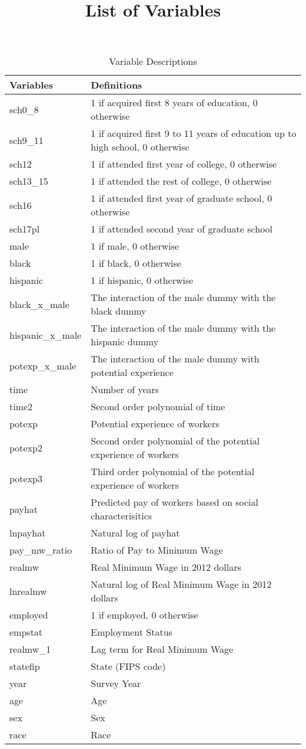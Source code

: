 \documentclass{article}
\title{List of Variables}
\date{}
\begin{document}
\begin{table}[ht]
\caption{Variable Descriptions}
\label{my-label}
\begin{tabular}{ll}
	\hline
	Variables & Definitions \\
	\hline
    sch0\_8 & 1 if acquired first 8 years of education, 0 otherwise \\
	sch9\_11 & 1 if acquired first  9 to 11 years of education up to high school, 0 otherwise\\
	sch12 & 1 if attended first year of college, 0 otherwise\\
    sch13\_15 &  1 if attended the rest of college, 0 otherwise\\
    sch16 & 1 if attended first year of graduate school, 0 otherwise\\
   	sch17pl & 1 if attended second year of graduate school\\
   	male & 1 if male, 0 otherwise\\
   	black & 1 if black, 0 otherwise\\
   	hispanic & 1 if hispanic, 0 otherwise\\
   	black\_x\_male & The interaction of the male dummy with the black dummy\\
    hispanic\_x\_male & The interaction of the male dummy with the hispanic dummy\\
   	potexp\_x\_male &The interaction of the male dummy with potential experience \\ 
    time & Number of years \\
   	time2 &Second order polynomial of time  \\
    potexp & Potential experience of workers\\
    potexp2 &Second order polynomial of the potential experience of workers\\
    potexp3 &Third order polynomial of the potential experience of workers \\
    payhat &Predicted pay of workers based on social characterisitics\\
    lnpayhat & Natural log of payhat \\
    pay\_mw\_ratio & Ratio of Pay to Minimum Wage \\
    realmw & Real Minimum Wage in 2012 dollars \\
    lnrealmw & Natural log of Real Minimum Wage in 2012 dollars \\
    employed &1 if employed, 0 otherwise \\
    empstat &Employment Status \\
    realmw\_1 & Lag term for Real Minimum Wage  \\
    statefip & State (FIPS code) \\
    year & Survey Year \\
    age & Age \\
    sex & Sex \\
    race & Race \\
    \hline 
\end{tabular}
\end{table}
\end{document}
